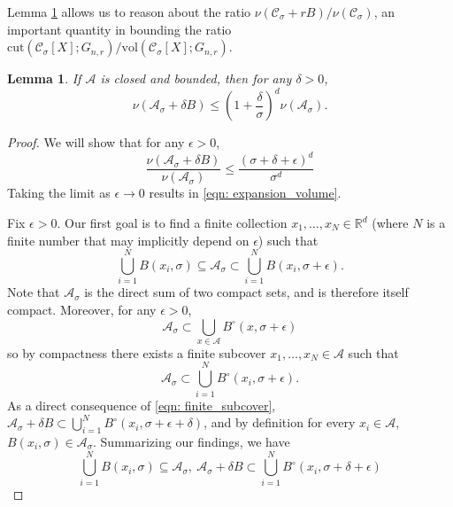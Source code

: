 \documentclass{article}
\newcommand{\vol}{\mathrm{vol}}
\newcommand{\cut}{\mathrm{cut}}
\newcommand{\Reals}{\mathbb{R}}
\newcommand{\Rd}{\Reals^d}
\newcommand{\1}{\mathbf{1}}
\newcommand{\Xbf}{X}             %
\newcommand{\Cset}{\mathcal{C}}
\newcommand{\Aset}{\mathcal{A}}
\newcommand{\Asig}{\Aset_{\sigma}}
\newcommand{\Csig}{\Cset_{\sigma}}
\theoremstyle{aldenthm}
\newtheorem{lemma}{Lemma}
\theoremstyle{aldenrmrk}
\begin{document}
Lemma \ref{lem: expansion_volume} allows us to reason about the ratio $\nu(\Csig + r B) / \nu(\Csig)$, an important quantity in bounding the ratio $\cut(\Csig[\Xbf]; G_{n,r})/\vol(\Csig[\Xbf]; G_{n,r})$. 

\begin{lemma}
	\label{lem: expansion_volume}
	If $\Aset$ is closed and bounded, then for any $\delta > 0$,
	\begin{equation}
	\label{eqn: expansion_volume}
	\nu(\Asig + \delta B) \leq \left(1 + \frac{\delta}{\sigma}\right)^d \nu(\Asig).
	\end{equation}
\end{lemma}
\begin{proof}
	We will show that for any $\epsilon > 0$, 
	\begin{equation}
	\label{eqn: ratio_of_volume}
	\frac{\nu(\Asig + \delta B)}{\nu(\Asig)} \leq \frac{(\sigma + \delta + \epsilon)^d}{\sigma^d}
	\end{equation}
	Taking the limit as $\epsilon \to 0$ results in \eqref{eqn: expansion_volume}.
	
	
	Fix $\epsilon > 0$. Our first goal is to find a finite collection $x_1, \ldots, x_N \in \Rd$ (where $N$ is a finite number that may implicitly depend on $\epsilon$) such that
	\begin{equation*}
	\bigcup_{i = 1}^{N} B(x_i, \sigma) \subseteq \Asig \subset \bigcup_{i = 1}^{N} B(x_i, \sigma + \epsilon).
	\end{equation*}
	Note that $\Asig$ is the direct sum of two compact sets, and is therefore itself compact. Moreover, for any $\epsilon > 0$,
	\begin{equation*}
	\Asig \subset \bigcup_{x \in \Aset} B^{\circ}(x,\sigma + \epsilon)
	\end{equation*}
	so by compactness there exists a finite subcover $x_1, \ldots,x_N \in \Aset$ such that
	\begin{equation}
	\label{eqn: finite_subcover}
	\Asig \subset \bigcup_{i = 1}^{N} B^{\circ}(x_i,\sigma + \epsilon).
	\end{equation}
	As a direct consequence of \eqref{eqn: finite_subcover}, $\Asig + \delta B \subset \bigcup_{i = 1}^{N} B^{\circ}(x_i,\sigma + \epsilon + \delta)$, and by definition for every $x_i \in \Aset$, $B(x_i,\sigma) \in \Asig$. Summarizing our findings, we have
	\begin{equation}
	\label{eqn: finite_subcover-1}
	\bigcup_{i = 1}^{N} B(x_i,\sigma) \subseteq \Asig  ,~\Asig + \delta B \subset \bigcup_{i = 1}^{N} B^{\circ}(x_i,\sigma + \delta + \epsilon)
	\end{equation}
	

\end{proof}
\end{document}
